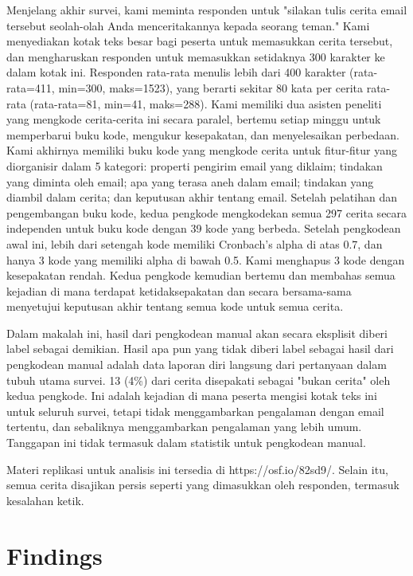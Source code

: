 \documentclass[lettersize,journal]{IEEEtran}
\begin{document}
Menjelang akhir survei, kami meminta responden untuk "silakan tulis cerita
email tersebut seolah-olah Anda menceritakannya kepada seorang teman." Kami
menyediakan kotak teks besar bagi peserta untuk memasukkan cerita tersebut, dan
mengharuskan responden untuk memasukkan setidaknya 300 karakter ke dalam kotak
ini. Responden rata-rata menulis lebih dari 400 karakter (rata-rata=411,
min=300, maks=1523), yang berarti sekitar 80 kata per cerita rata-rata
(rata-rata=81, min=41, maks=288). Kami memiliki dua asisten peneliti yang
mengkode cerita-cerita ini secara paralel, bertemu setiap minggu untuk
memperbarui buku kode, mengukur kesepakatan, dan menyelesaikan perbedaan. Kami
akhirnya memiliki buku kode yang mengkode cerita untuk fitur-fitur yang
diorganisir dalam 5 kategori: properti pengirim email yang diklaim; tindakan
yang diminta oleh email; apa yang terasa aneh dalam email; tindakan yang
diambil dalam cerita; dan keputusan akhir tentang email. Setelah pelatihan dan
pengembangan buku kode, kedua pengkode mengkodekan semua 297 cerita secara
independen untuk buku kode dengan 39 kode yang berbeda. Setelah pengkodean awal
ini, lebih dari setengah kode memiliki Cronbach’s alpha di atas 0.7, dan hanya
3 kode yang memiliki alpha di bawah 0.5. Kami menghapus 3 kode dengan
kesepakatan rendah. Kedua pengkode kemudian bertemu dan membahas semua kejadian
di mana terdapat ketidaksepakatan dan secara bersama-sama menyetujui keputusan
akhir tentang semua kode untuk semua cerita.

Dalam makalah ini, hasil dari pengkodean manual akan secara eksplisit diberi
label sebagai demikian. Hasil apa pun yang tidak diberi label sebagai hasil
dari pengkodean manual adalah data laporan diri langsung dari pertanyaan dalam
tubuh utama survei. 13 (4\%) dari cerita disepakati sebagai "bukan cerita" oleh
kedua pengkode. Ini adalah kejadian di mana peserta mengisi kotak teks ini
untuk seluruh survei, tetapi tidak menggambarkan pengalaman dengan email
tertentu, dan sebaliknya menggambarkan pengalaman yang lebih umum. Tanggapan
ini tidak termasuk dalam statistik untuk pengkodean manual.

Materi replikasi untuk analisis ini tersedia di https://osf.io/82sd9/. Selain
itu, semua cerita disajikan persis seperti yang dimasukkan oleh responden,
termasuk kesalahan ketik.

\section{Findings}
\end{document}
